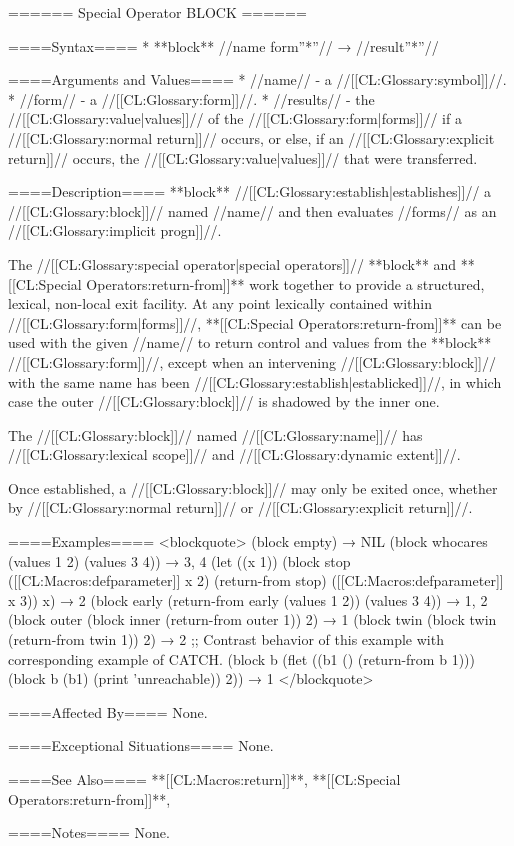 ====== Special Operator BLOCK ======

====Syntax====
  * **block** //name form''*''// → //result''*''//

====Arguments and Values====
  * //name// - a //[[CL:Glossary:symbol]]//.
  * //form// - a //[[CL:Glossary:form]]//.
  * //results// - the //[[CL:Glossary:value|values]]// of the //[[CL:Glossary:form|forms]]// if a //[[CL:Glossary:normal return]]// occurs, or else, if an //[[CL:Glossary:explicit return]]// occurs, the //[[CL:Glossary:value|values]]// that were transferred.

====Description====
**block** //[[CL:Glossary:establish|establishes]]// a //[[CL:Glossary:block]]// named //name// and then evaluates //forms// as an //[[CL:Glossary:implicit progn]]//.

The //[[CL:Glossary:special operator|special operators]]// **block** and **[[CL:Special Operators:return-from]]** work together to provide a structured, lexical, non-local exit facility. At any point lexically contained within //[[CL:Glossary:form|forms]]//, **[[CL:Special Operators:return-from]]** can be used with the given //name// to return control and values from the **block** //[[CL:Glossary:form]]//, except when an intervening //[[CL:Glossary:block]]// with the same name has been //[[CL:Glossary:establish|establicked]]//, in which case the outer //[[CL:Glossary:block]]// is shadowed by the inner one.

The //[[CL:Glossary:block]]// named //[[CL:Glossary:name]]// has //[[CL:Glossary:lexical scope]]// and //[[CL:Glossary:dynamic extent]]//.

Once established, a //[[CL:Glossary:block]]// may only be exited once, whether by //[[CL:Glossary:normal return]]// or //[[CL:Glossary:explicit return]]//.

====Examples====
<blockquote> (block empty) → NIL (block whocares (values 1 2) (values 3 4)) → 3, 4 (let ((x 1)) (block stop ([[CL:Macros:defparameter]] x 2) (return-from stop) ([[CL:Macros:defparameter]] x 3)) x) → 2 (block early (return-from early (values 1 2)) (values 3 4)) → 1, 2 (block outer (block inner (return-from outer 1)) 2) → 1 (block twin (block twin (return-from twin 1)) 2) → 2 ;; Contrast behavior of this example with corresponding example of CATCH. (block b (flet ((b1 () (return-from b 1))) (block b (b1) (print 'unreachable)) 2)) → 1 </blockquote>

====Affected By====
None.

====Exceptional Situations====
None.

====See Also====
**[[CL:Macros:return]]**, **[[CL:Special Operators:return-from]]**, {\secref\Evaluation}

====Notes====
None.
